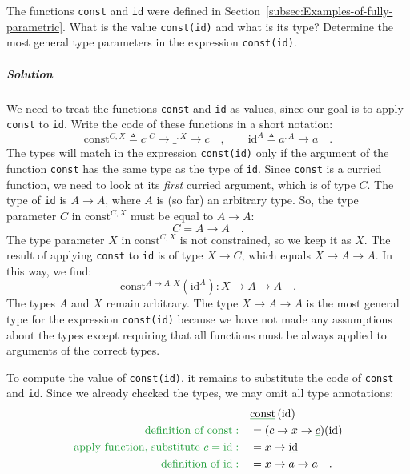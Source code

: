 The functions \lstinline!const! and \lstinline!id! were defined
in Section~\ref{subsec:Examples-of-fully-parametric}. What is the
value \lstinline!const(id)! and what is its type? Determine the most
general type parameters in the expression \lstinline!const(id)!.

\subparagraph{Solution}

We need to treat the functions \lstinline!const! and \lstinline!id!
as values, since our goal is to apply \lstinline!const! to \lstinline!id!.
Write the code of these functions in a short notation:
\[
\text{const}^{C,X}\triangleq c^{:C}\rightarrow\_^{:X}\rightarrow c\quad,\quad\quad\text{id}^{A}\triangleq a^{:A}\rightarrow a\quad.
\]
The types will match in the expression \lstinline!const(id)! only
if the argument of the function \lstinline!const! has the same type
as the type of \lstinline!id!. Since \lstinline!const! is a curried
function, we need to look at its \emph{first} curried argument, which
is of type $C$. The type of \lstinline!id! is $A\rightarrow A$,
where $A$ is (so far) an arbitrary type. So, the type parameter $C$
in $\text{const}^{C,X}$ must be equal to $A\rightarrow A$:
\[
C=A\rightarrow A\quad.
\]
 The type parameter $X$ in $\text{const}^{C,X}$ is not constrained,
so we keep it as $X$. The result of applying \lstinline!const! to
\lstinline!id! is of type $X\rightarrow C$, which equals $X\rightarrow A\rightarrow A$.
In this way, we find:
\[
\text{const}^{A\rightarrow A,X}(\text{id}^{A}):X\rightarrow A\rightarrow A\quad.
\]
The types $A$ and $X$ remain arbitrary. The type $X\rightarrow A\rightarrow A$
is the most general type for the expression \lstinline!const(id)!
because we have not made any assumptions about the types except requiring
that all functions must be always applied to arguments of the correct
types.

To compute the value of \lstinline!const(id)!, it remains to substitute
the code of \lstinline!const! and \lstinline!id!. Since we already
checked the types, we may omit all type annotations:
\begin{align*}
 & \gunderline{\text{const}}\left(\text{id}\right)\\
{\color{greenunder}\text{definition of const}:}\quad & =(c\rightarrow x\rightarrow\gunderline c)(\text{id})\\
{\color{greenunder}\text{apply function, substitute }c=\text{id}:}\quad & =x\rightarrow\gunderline{\text{id}}\\
{\color{greenunder}\text{definition of }\text{id}:}\quad & =x\rightarrow a\rightarrow a\quad.
\end{align*}

